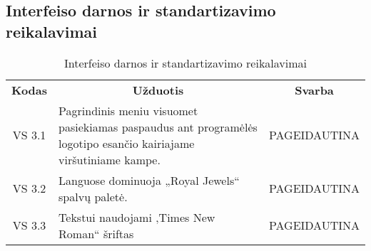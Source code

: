 \documentclass{VUMIFPSkursinis}
\begin{document}
\subsection{Interfeiso darnos ir standartizavimo reikalavimai}
\begin{center}
	\begin{table}[H]
	\begin{tabular}{|p{2cm}|p{14cm}|p{2cm}|}
	\hline
	    \rowcolor{lightgray}
	    \multicolumn{3}{|c|}{Interfeiso darnos ir standartizavimo reikalavimai}\\
	\hline
		\multicolumn{1}{|c|}{{\bfseries Kodas}}&
		\multicolumn{1}{|c|}{ {\bfseries Užduotis}}&
		\multicolumn{1}{|c|}{{\bfseries Svarba}}\\		
	\hline
		\multicolumn{1}{|c|}{VS 3.1}&
		\multicolumn{1}{|p{12,9cm}|}{Pagrindinis meniu visuomet pasiekiamas paspaudus ant programėlės logotipo esančio kairiajame viršutiniame kampe.}& 
		\multicolumn{1}{|p{1.5cm}|}{PAGEIDAUTINA}\\
	\hline
		\multicolumn{1}{|c|}{VS 3.2}&
		\multicolumn{1}{|p{12cm}|}{Languose dominuoja „Royal Jewels“ spalvų paletė.}& 
		\multicolumn{1}{|p{1.5cm}|}{PAGEIDAUTINA}\\
	\hline
		\multicolumn{1}{|c|}{VS 3.3}&
		\multicolumn{1}{|p{12cm}|}{Tekstui naudojami ‚Times New Roman“ šriftas}& 
		\multicolumn{1}{|p{1.5cm}|}{PAGEIDAUTINA}\\
	\hline  	 	
	
	\end{tabular}
	\caption{Interfeiso darnos ir standartizavimo reikalavimai}
	\label{table:4}
	\end{table}

\end{center}
\end{document}
